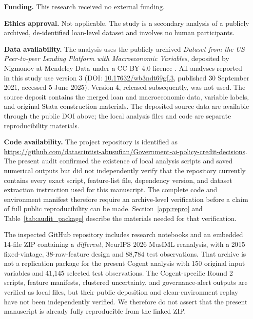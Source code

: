 \documentclass[10pt]{article}
\begin{document}
 \noindent\textbf{Funding.} This research received no external funding.

 \noindent\textbf{Ethics approval.} Not applicable. The study is a secondary analysis of a publicly archived, de-identified loan-level dataset and involves no human participants.


\noindent\textbf{Data availability.}
The analysis uses the publicly archived \textit{Dataset from the US Peer-to-peer Lending Platform with Macroeconomic Variables}, deposited by Nigmonov at Mendeley Data under a CC BY 4.0 licence \cite{ref48}. All analyses reported in this study use version 3 (DOI: \href{https://doi.org/10.17632/wb3ndt69gf.3}{10.17632/wb3ndt69gf.3}, published 30 September 2021, accessed 5 June 2025). Version 4, released subsequently, was not used. The source deposit contains the merged loan and macroeconomic data, variable labels, and original Stata construction materials. The deposited source data are available through the public DOI above; the local analysis files and code are separate reproducibility materials.


\noindent\textbf{Code availability.}
The project repository is identified as \url{https://github.com/datascintist-abusufian/Government-ai-policy-credit-decisions}. The present audit confirmed the existence of local analysis scripts and saved numerical outputs but did not independently verify that the repository currently contains every exact script, feature-list file, dependency version, and dataset extraction instruction used for this manuscript. The complete code and environment manifest therefore require an archive-level verification before a claim of full public reproducibility can be made. Section~\ref{app:repro} and Table~\ref{tab:audit_package} describe the materials needed for that verification.

The inspected GitHub repository includes research notebooks and an embedded 14-file ZIP containing a \emph{different}, NeurIPS 2026 MusIML reanalysis, with a 2015 fixed-vintage, 38-raw-feature design and 88,784 test observations. That archive is not a replication package for the present Cogent analysis with 150 original input variables and 41,145 selected test observations. The Cogent-specific Round 2 scripts, feature manifests, clustered uncertainty, and governance-alert outputs are verified as local files, but their public deposition and clean-environment replay have not been independently verified. We therefore do not assert that the present manuscript is already fully reproducible from the linked ZIP.
\end{document}
